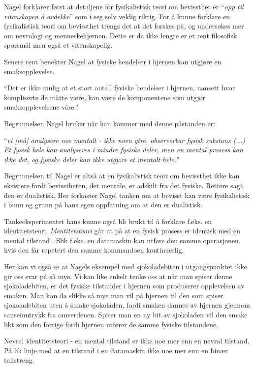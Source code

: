 Nagel forklarer først at detaljene for fysikalistisk teori om bevissthet er ``\emph{opp til vitenskapen å avdekke}'' som i seg selv veldig riktig.
For å kunne forklare en fysikalistisk teori om bevissthet trengs det at det forskes på,
og undersøkes mer om nevrologi og menneskehjernen. Dette er da ikke lengre er et rent filosofisk spørsmål men også et vitenskapelig.

Senere rent benekter Nagel at fysiske hendelser i hjernen kan utgjøre en smaksopplevelse.
\begin{pquotation}{\cite[36]{Nagel2003}}
    ``Det er ikke mulig at et stort antall fysiske hendelser i hjernen,
uansett hvor kompliserte de måtte være, 
kan være de komponentene som utgjør smaksopplevelsene våre.''
\end{pquotation}
Begrunnelsen Nagel bruker når han kommer med denne påstanden er:
\begin{pquotation}{\cite[36]{Nagel2003}}
``\textit{vi [må] analysere noe mentalt - ikke noen ytre, observerbar fysisk substans (...) 
Et fysisk hele kan analyseres i mindre fysiske deler, men en
mental prosess kan ikke det, og fysiske deler kan ikke utgjøre et mentalt hele.}''
\end{pquotation}
Begrunnelsen til Nagel er altså at en fysikalistisk teori om bevissthet ikke kan eksistere fordi bevisstheten, 
det mentale, er adskilt fra det fysiske. Rettere sagt, den er dualistisk. 
Her forkaster Nagel tanken om at bevisst kan være fysikalistisk i bunn og grunn på hans egen oppfatning om at den er dualistisk.

Tankeeksperimentet hans kunne også bli brukt til å forklare f.eks. en identitetsteori.
\textit{Identitetsteori} går ut på at en fysisk prosess er identisk med en mental tilstand \autocite{snl:identitetsteori}.
Slik f.eks. en datamaskin kan utføre den samme operasjonen,
hvis den får repetert den samme kommandoen kontinuerlig.

Her kan vi også se at Nagels eksempel med sjokoladebiten i utgangspunktet 
ikke gir oss svar på så mye.
Vi kan like enkelt tenke oss at når man spiser denne sjokoladebiten,
er det fysiske tilstander i hjernen som produserer opplevelsen av smaken. 
Man kan da slikke så mye man vil på hjernen til den som spiser sjokoladebiten 
uten å smake sjokoladen, fordi smaken dannes av hjernen gjennom sanseinntrykk fra omverdenen.
Spiser man en ny bit av sjokoladen vil den smake likt som den forrige fordi hjernen 
utfører de samme fysiske tilstandene.



Nevral identitetsteori - en mental tilstand er ikke noe mer enn en nevral tilstand.
På lik linje med at en tilstand i en datamaskin ikke noe mer enn en binær tallstreng.
